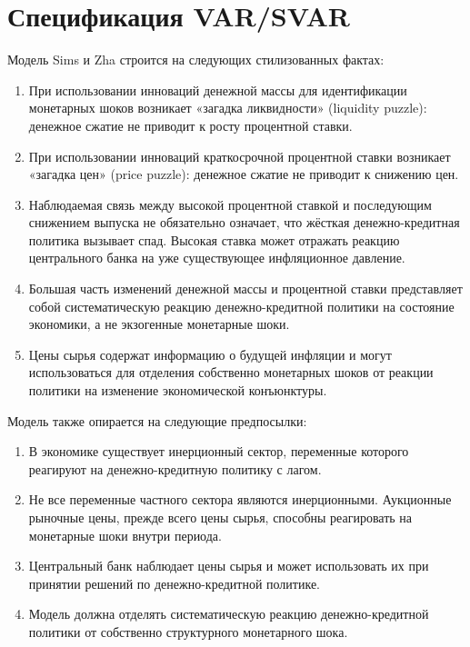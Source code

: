 \section{Спецификация VAR/SVAR}

Модель Sims и Zha строится на следующих стилизованных фактах:

\begin{enumerate}
\item При использовании инноваций денежной массы для идентификации монетарных шоков возникает «загадка ликвидности» (liquidity puzzle): денежное сжатие не приводит к росту процентной ставки.

\item При использовании инноваций краткосрочной процентной ставки возникает «загадка цен» (price puzzle): денежное сжатие не приводит к снижению цен.

\item Наблюдаемая связь между высокой процентной ставкой и последующим снижением выпуска не обязательно означает, что жёсткая денежно-кредитная политика вызывает спад. Высокая ставка может отражать реакцию центрального банка на уже существующее инфляционное давление.

\item Большая часть изменений денежной массы и процентной ставки представляет собой систематическую реакцию денежно-кредитной политики на состояние экономики, а не экзогенные монетарные шоки.

\item Цены сырья содержат информацию о будущей инфляции и могут использоваться для отделения собственно монетарных шоков от реакции политики на изменение экономической конъюнктуры.

\end{enumerate}

Модель также опирается на следующие предпосылки:

\begin{enumerate}
\item В экономике существует инерционный сектор, переменные которого реагируют на денежно-кредитную политику с лагом.

\item Не все переменные частного сектора являются инерционными. Аукционные рыночные цены, прежде всего цены сырья, способны реагировать на монетарные шоки внутри периода.

\item Центральный банк наблюдает цены сырья и может использовать их при принятии решений по денежно-кредитной политике.

\item Модель должна отделять систематическую реакцию денежно-кредитной политики от собственно структурного монетарного шока.

\end{enumerate}

